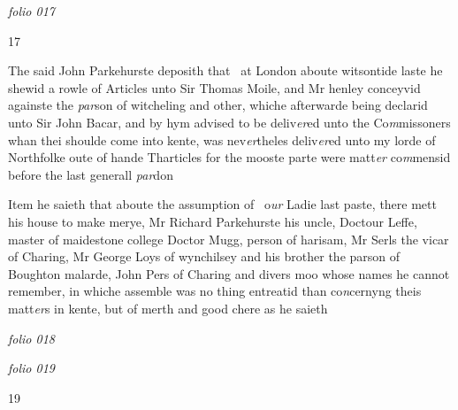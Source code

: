 \documentclass[12pt, a4paper]{book}
\begin{document}
\textit{folio 017}
			
			\begin{flushright}{\color{Mahogany}17}\end{flushright}
            		
		\ifthenelse{\isodd{\thepage}}
		{\reversemarginpar}
		{\normalmarginpar}
		The said John Parkehurste deposith that 
            			at London aboute witsontide laste he shewid
            			a rowle of Articles unto Sir Thomas
 	Moile, and Mr henley conceyvid againste
            			the \textit{par}son of witcheling and other, whiche
            			afterwarde being declarid unto Sir John
 Bacar, and by hym advised to be deliv\textit{er}ed
 unto the Co\textit{m}missoners whan thei shoulde
 come into kente, was nev\textit{er}theles deliv\textit{er}ed
            			unto my lorde of Northfolke oute of hande
 Tharticles for the mooste parte were matt\textit{er}
 co\textit{m}mensid before the last generall \textit{par}don
            		
            			
				\marginpar[\vspace{0.5cm}{\textcolor{Gray}{John Parkehurste of Leneham in kente}}]{}
			
            			
		\ifthenelse{\isodd{\thepage}}
		{\reversemarginpar}
		{\normalmarginpar}
		Item he saieth that aboute the assumption of 
 o\textit{ur} Ladie last paste, there mett  his house to
            				make merye, Mr Richard Parkehurste his
            				uncle, Doctour Leffe, master of maidestone college
            				Doctor Mugg, person of harisam, Mr Serls
 the vicar of Charing, Mr George Loys of
 wynchilsey and his brother the parson of
 	Boughton malarde, John Pers of Charing
 and divers moo whose names he cannot
 remember, in whiche assemble was no
 thing entreatid than co\textit{n}cernyng theis matt\textit{er}s
 in kente, but of merth and good chere as he
 saieth
 

\dotfill
						\newpage
{}

\textit{folio 018}
		
      		\vspace*{4cm}
         
      	
\dotfill
						

\textit{folio 019}
		
		\begin{flushright}{\color{Mahogany}19}\end{flushright}
      		\vspace*{4cm}
\end{document}
